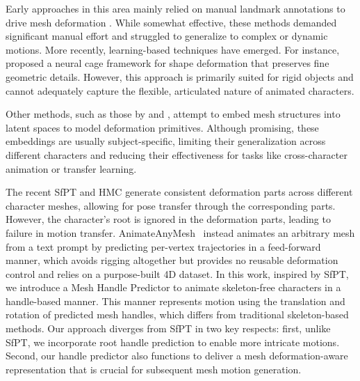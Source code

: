 \documentclass[lettersize,journal]{IEEEtran}
\newcommand{\blu}[1]{\texorpdfstring{{\leavevmode\color{blue}#1}}{#1}}
\begin{document}
Early approaches in this area mainly relied on manual landmark annotations to drive mesh deformation \cite{ben2009spatial, sumner2004deformation}. While somewhat effective, these methods demanded significant manual effort and struggled to generalize to complex or dynamic motions. More recently, learning-based techniques have emerged. For instance, \cite{yifan2020neural} proposed a neural cage framework for shape deformation that preserves fine geometric details. However, this approach is primarily suited for rigid objects and cannot adequately capture the flexible, articulated nature of animated characters.

Other methods, such as those by \cite{tan2018variational} and \cite{yang2021multiscale}, attempt to embed mesh structures into latent spaces to model deformation primitives. Although promising, these embeddings are usually subject-specific, limiting their generalization across different characters and reducing their effectiveness for tasks like cross-character animation or transfer learning.

The recent SfPT \cite{liao2022skeleton} and HMC \cite{wang2023hmc} generate consistent deformation parts across different character meshes, allowing for pose transfer through the corresponding parts. However, the character's root is ignored in the deformation parts, leading to failure in motion transfer. \blu{AnimateAnyMesh~\cite{wu2025animateanymesh} instead animates an arbitrary mesh from
a text prompt by predicting per-vertex trajectories in a feed-forward manner, which avoids
rigging altogether but provides no reusable deformation control and relies on a
purpose-built 4D dataset.} In this work, inspired by SfPT, we introduce a Mesh Handle Predictor to animate skeleton-free characters in a handle-based manner. This manner represents motion using the translation and rotation of predicted mesh handles, which differs from traditional skeleton-based methods. Our approach diverges from SfPT in two key respects: first, unlike SfPT, we incorporate root handle prediction to enable more intricate motions. Second, our handle predictor also functions to deliver a mesh deformation-aware representation that is crucial for subsequent mesh motion generation.
\end{document}
